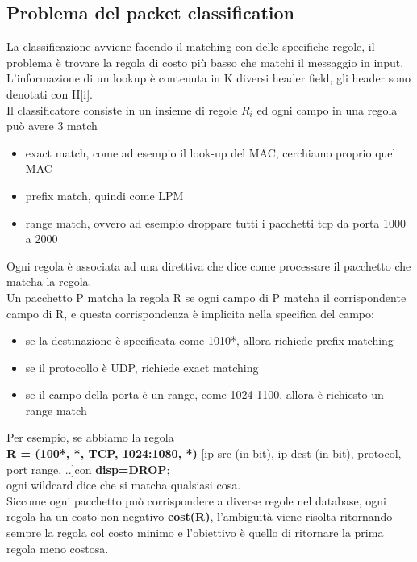 \documentclass[12pt, oneside]{extbook} %
\begin{document}
\subsection{Problema del packet classification}
La classificazione avviene facendo il matching con delle specifiche regole, il problema è trovare la regola di costo più basso che matchi il messaggio in input.
\\L'informazione di un lookup è contenuta in K diversi header field, gli header sono denotati con H[i].
\\Il classificatore consiste in un insieme di regole $R_i$ ed ogni campo in una regola può avere 3 match
\begin{itemize}
\item exact match, come ad esempio il look-up del MAC, cerchiamo proprio quel MAC
\item prefix match, quindi come LPM
\item range match, ovvero ad esempio droppare tutti i pacchetti tcp da porta 1000 a 2000
\end{itemize}
Ogni regola è associata ad una direttiva che dice come processare il pacchetto che matcha la regola.
\\Un pacchetto P matcha la regola R se ogni campo di P matcha il corrispondente campo di R, e questa corrispondenza è implicita nella specifica del campo:
\begin{itemize}
    \item se la destinazione è specificata come 1010*, allora richiede prefix matching
    \item se il protocollo è UDP, richiede exact matching
    \item se il campo della porta è un range, come 1024-1100, allora è richiesto un range match 
\end{itemize}
Per esempio, se abbiamo la regola\\ 
\textbf{R = (100*, *, TCP, 1024:1080, *)} [ip src (in bit), ip dest (in bit), protocol, port range, ..]con \textbf{disp=DROP};
\\ogni wildcard dice che si matcha qualsiasi cosa.
\\Siccome ogni pacchetto può corrispondere a diverse regole nel database, ogni regola ha un costo non negativo \textbf{cost(R)}, l'ambiguità viene risolta ritornando sempre la regola col costo minimo e l'obiettivo è quello di ritornare la prima regola meno costosa.
\end{document}

